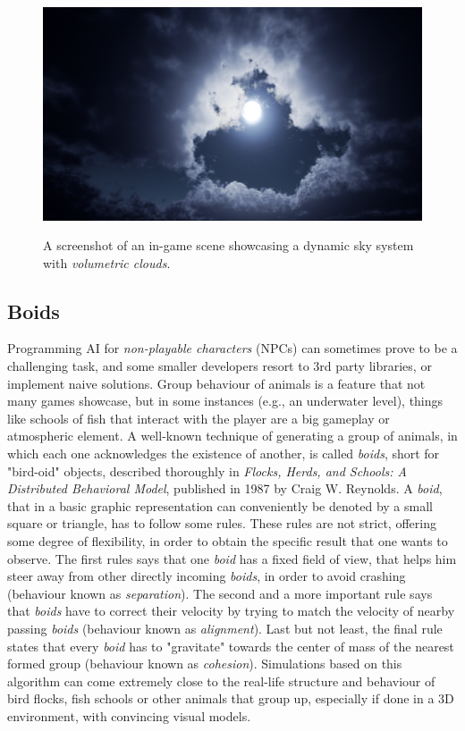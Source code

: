 \begin{figure}[htp]
    \centering
    \includegraphics[width = 16cm]{figures/clouds.png}
    \caption{A screenshot of an in-game scene showcasing a dynamic sky system with \textit{volumetric clouds}.}
    \cite{dynamicSky}
    \label{fig:clouds}
\end{figure}

\subsection{Boids}

Programming AI for \textit{non-playable characters} (NPCs) can sometimes prove to be a challenging task, and some smaller developers resort to 3rd party libraries, or implement naive solutions. Group behaviour of animals is a feature that not many games showcase, but in some instances (e.g., an underwater level), things like schools of fish that interact with the player are a big gameplay or atmospheric element. A well-known technique of generating a group of animals, in which each one acknowledges the existence of another, is called \textit{boids}, short for "bird-oid" objects, described thoroughly in \textit{Flocks, Herds, and Schools: A Distributed Behavioral Model}\cite{reynolds1987flocks}, published in 1987 by Craig W. Reynolds. A \textit{boid}, that in a basic graphic representation can conveniently be denoted by a small square or triangle, has to follow some rules. These rules are not strict, offering some degree of flexibility, in order to obtain the specific result that one wants to observe. The first rules says that one \textit{boid} has a fixed field of view, that helps him steer away from other directly incoming \textit{boids}, in order to avoid crashing (behaviour known as \textit{separation}). The second and a more important rule says that \textit{boids} have to correct their velocity by trying to match the velocity of nearby passing \textit{boids} (behaviour known as \textit{alignment}). Last but not least, the final rule states that every \textit{boid} has to "gravitate" towards the center of mass of the nearest formed group (behaviour known as \textit{cohesion}). Simulations based on this algorithm can come extremely close to the real-life structure and behaviour of bird flocks, fish schools or other animals that group up, especially if done in a 3D environment, with convincing visual models.